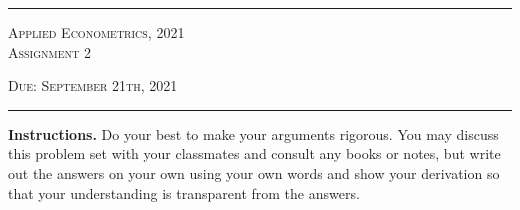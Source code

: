 \documentclass[11pt]{article}
\begin{document}

\fancyhead[C]{}
\hrule \medskip
\begin{minipage}{0.9\textwidth}
\centering
\large
\textsc{Applied Econometrics, 2021}\\
\textsc{Assignment} 2\\
\normalsize

\textsc{Due: September 21th, 2021}
\end{minipage}
\medskip \hrule
\bigskip



\noindent \textbf{Instructions.} Do your best to make your arguments
rigorous. You may discuss this problem set with your classmates and consult
any books or notes, but write out the answers on your own using your own
words and show your derivation so that your understanding is transparent
from the answers.  \bigskip
\end{document}
